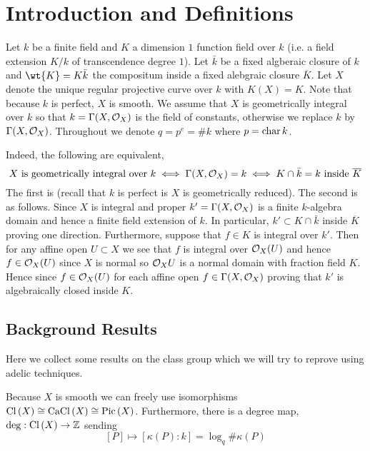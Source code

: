 \documentclass[12pt]{article}
\begin{document}
\section{Introduction and Definitions}

Let $k$ be a finite field and $K$ a dimension $1$ function field over $k$ (i.e. a field extension $K/k$ of transcendence degree $1$). Let $\bar{k}$ be a fixed algberaic closure of $k$ and $\wt{K} = K \bar{k}$ the compositum inside a fixed alebgraic closure $\overline{K}$. Let $X$ denote the unique regular projective curve over $k$ with $K(X) = K$. Note that because $k$ is perfect, $X$ is smooth. We assume that $X$ is geometrically integral over $k$ so that $k = \Gamma(X, \mathcal{O}_{X})$ is the field of constants, otherwise we replace $k$ by $\Gamma(X, \mathcal{O}_{X})$. Throughout we denote $q = p^e = \# k$ where $p = \operatorname{\mathrm{char}}{k}$.

\begin{rmk}
Indeed, the following are equivalent,
\[ X \text{ is geometrically integral over } k \iff \Gamma(X, \mathcal{O}_{X}) = k \iff K \cap \bar{k} = k \text{ inside } \overline{K} \]
The first is  (recall that $k$ is perfect is $X$ is geometrically reduced). The second is as follows. Since $X$ is integral and proper $k' = \Gamma(X, \mathcal{O}_{X})$ is a finite $k$-algebra domain and hence a finite field extension of $k$. In particular, $k' \subset K \cap \bar{k}$ inside $\overline{K}$ proving one direction. Furthermore, suppose that $f \in K$ is integral over $k'$. Then for any affine open $U \subset X$ we see that $f$ is integral over $\mathcal{O}_{X}(U)$ and hence $f \in \mathcal{O}_{X}(U)$ since $X$ is normal so $\mathcal{O}_{X}{U}$ is a normal domain with fraction field $K$. Hence since $f \in \mathcal{O}_{X}(U)$ for each affine open $f \in \Gamma(X, \mathcal{O}_{X})$ proving that $k'$ is algebraically closed inside $K$. 
\end{rmk}

\subsection{Background Results}

Here we collect some results on the class group which we will try to reprove using adelic techniques.

\begin{rmk}
Because $X$ is smooth we can freely use isomorphisms $\mathrm{Cl} \left( X \right) \cong \mathrm{CaCl}\left( X \right) \cong \mathrm{Pic} \left( X \right)$. Furthermore, there is a degree map, $\deg : \mathrm{Cl} \left( X \right) \to \mathbb{Z}$ sending 
\[ [P] \mapsto [\kappa(P) : k] = \log_q{\# \kappa(P)} \]
\end{rmk}
\end{document}
